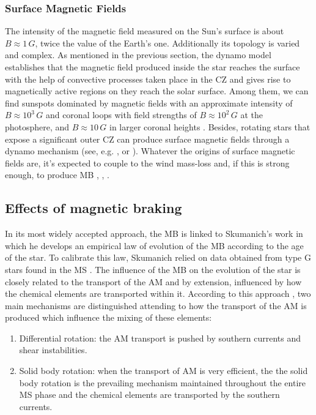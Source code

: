 \documentclass[fleqn,usenatbib]{mnras}
\begin{document}
\subsubsection{Surface Magnetic Fields} \label{surf_mf}
The intensity of the magnetic field measured on the Sun's surface is about $B\approx1\, G$, twice the value of the Earth's one. Additionally its topology is varied and complex. As mentioned in the previous section, the dynamo model establishes that the magnetic field produced inside the star reaches the surface with the help of convective processes taken place in the CZ and gives rise to magnetically active regions on they reach the solar surface. Among them, we can find sunspots dominated by magnetic fields with an approximate intensity of $B\approx10^3\, G$ and coronal loops with field strengths of $B\approx10^2\, G$ at the photosphere, and $B\approx 10\, G$ in larger coronal heights \citep{Aschwanden2014}. Besides, rotating stars that expose a significant outer CZ can produce surface magnetic fields through a dynamo mechanism (see, e.g. \citet{Brandenburg2004}, \citet{Charbonneau2010} or \citet{Brun2017}). Whatever the origins of surface magnetic fields are, it's expected to couple to the wind mass-loss and, if this is strong enough, to produce MB \citet{UdDoula2002}, \citet{Ud-Doula2007}, \citet{Ud-Doula2008} \citet{Meynet2010}.\par

\subsection{Effects of magnetic braking}
In its most widely accepted approach, the MB is linked to Skumanich's work in which he develops an empirical law of evolution of the MB according to the age of the star. To calibrate this law, Skumanich relied on data obtained from type G stars found in the MS \citep{Skumanich1972}. The influence of the MB on the evolution of the star is closely related to the transport of the AM and by extension, influenced by how the chemical elements are transported within it. According to this approach \citep{Meynet2010}, two main mechanisms are distinguished attending to how the transport of the AM is produced which influence the mixing of these elements:

\begin{enumerate}
    \item Differential rotation: the AM transport is pushed by southern currents and shear instabilities.
    \item Solid body rotation: when the transport of AM is very efficient, the the solid body rotation is the prevailing mechanism maintained throughout the entire MS phase and the chemical elements are transported by the southern currents.
\end{enumerate}
\end{document}
